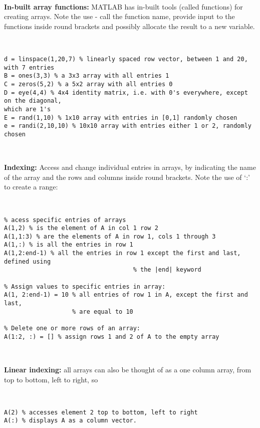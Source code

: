 \documentclass[11pt]{amsart}
\begin{document}
\

{\bf In-built array functions:} MATLAB has in-built tools (called functions) for creating arrays. Note the use - call the function name, provide input to the functions inside round brackets and possibly allocate the result to a new variable.

\

\color{blue}
\begin{verbatim}
d = linspace(1,20,7) % linearly spaced row vector, between 1 and 20, with 7 entries
B = ones(3,3) % a 3x3 array with all entries 1
C = zeros(5,2) % a 5x2 array with all entries 0
D = eye(4,4) % 4x4 identity matrix, i.e. with 0's everywhere, except on the diagonal, 
which are 1's
E = rand(1,10) % 1x10 array with entries in [0,1] randomly chosen
e = randi(2,10,10) % 10x10 array with entries either 1 or 2, randomly chosen 
\end{verbatim}
\color{black}

\

{\bf Indexing:} Access and change individual entries in arrays, by indicating the name of the array and the rows and columns inside round brackets. Note the use of `:'  to create a range:

\

\color{blue}
\begin{verbatim}
% acess specific entries of arrays
A(1,2) % is the element of A in col 1 row 2
A(1,1:3) % are the elements of A in row 1, cols 1 through 3 
A(1,:) % is all the entries in row 1
A(1,2:end-1) % all the entries in row 1 except the first and last, defined using 
	 							    % the |end| keyword
 
% Assign values to specific entries in array: 
A(1, 2:end-1) = 10 % all entries of row 1 in A, except the first and last, 
                   % are equal to 10

% Delete one or more rows of an array: 
A(1:2, :) = [] % assign rows 1 and 2 of A to the empty array
\end{verbatim}
\color{black}

\

{\bf Linear indexing:} all arrays can also be thought of as a one column array, from top to bottom, left to right, so 

\

\color{blue}
\begin{verbatim}
A(2) % accesses element 2 top to bottom, left to right
A(:) % displays A as a column vector.
\end{verbatim}
\color{black}
\end{document}
